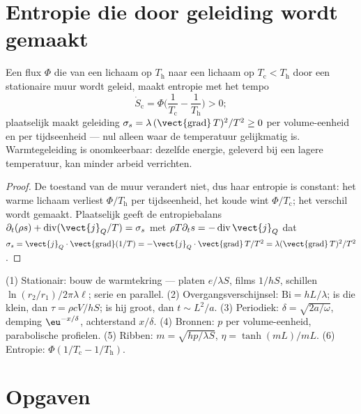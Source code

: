 \section{Entropie die door geleiding wordt gemaakt}

\begin{proposition}[Entropieproductie]\label{prop:b2:heat-conduction:entropy}
Een flux $\Phi$ die van een lichaam op $T_{\text{h}}$ naar een lichaam op
$T_{\text{c}} < T_{\text{h}}$ door een stationaire muur wordt geleid, maakt
entropie met
het tempo
\[
\dot S_{\text{c}} = \Phi\Big(\frac{1}{T_{\text{c}}} - \frac{1}{T_{\text{h}}}\Big) > 0 ;
\]
plaatselijk maakt geleiding
$\sigma_s = \lambda\,(\vect{\operatorname{grad}}\,T)^2/T^2
\ge 0$ per
volume-eenheid en per tijdseenheid --- nul alleen waar de temperatuur
gelijkmatig is. Warmtegeleiding is onomkeerbaar: dezelfde energie, geleverd bij
een lagere temperatuur, kan minder arbeid verrichten.
\end{proposition}

\begin{proof}
De toestand van de muur verandert niet, dus haar entropie is constant: het warme
lichaam verliest $\Phi/T_{\text{h}}$ per tijdseenheid, het koude wint
$\Phi/T_{\text{c}}$; het verschil wordt gemaakt. Plaatselijk geeft de entropiebalans
$\partial_t(\rho s) + \operatorname{div}(\vect{j}_Q/T) = \sigma_s$
met $\rho T\partial_t s = -\operatorname{div}\vect{j}_Q$ dat
$\sigma_s =
\vect{j}_Q\cdot\vect{\operatorname{grad}}(1/T) = -\vect{j}_Q\cdot
\vect{\operatorname{grad}}\,T/T^2 = \lambda(\vect{\operatorname{grad}}\,T)^2/T^2$.
\end{proof}

\begin{method}[Geleidingsschattingen]\label{meth:b2:heat-conduction:method}
(1) Stationair: bouw de warmtekring --- platen $e/\lambda S$, films
$1/hS$, schillen $\ln(r_2/r_1)/2\pi\lambda\ell$; serie en parallel.
(2) Overgangsverschijnsel: $\mathrm{Bi} = hL/\lambda$; is die klein, dan
$\tau = \rho cV/hS$; is hij
groot, dan $t \sim L^2/a$. (3) Periodiek: $\delta = \sqrt{2a/\omega}$, demping
$\eu^{-x/\delta}$, achterstand $x/\delta$. (4) Bronnen: $p$ per
volume-eenheid, parabolische
profielen. (5) Ribben: $m = \sqrt{hp/\lambda S}$, $\eta = \tanh(mL)/mL$. (6)
Entropie: $\Phi(1/T_{\text{c}} - 1/T_{\text{h}})$.
\end{method}

\section{Opgaven}

